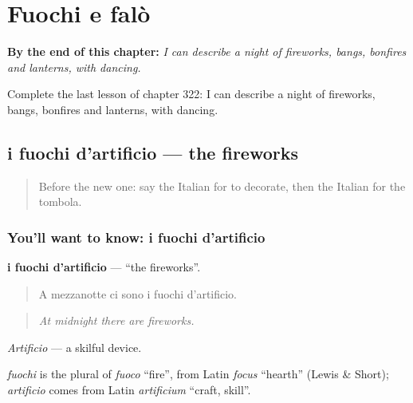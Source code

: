 
\chapter{Fuochi e falò}
\label{ch:it-fuochi-e-falo}

\begin{chapteropening}
\textbf{By the end of this chapter:} \emph{I can describe a night of fireworks, bangs, bonfires and lanterns, with dancing.}

Complete the last lesson of chapter 322: I can describe a night of fireworks, bangs, bonfires and lanterns, with dancing.
\end{chapteropening}

\section[i fuochi d'artificio]{i fuochi d'artificio — the fireworks}

\label{lesson:IT-C322-fuochi-d-artificio}



\begin{quote}
Before the new one: say the Italian for to decorate, then the Italian for the tombola.
\end{quote}

\subsection*{You'll want to know: i fuochi d'artificio}
\textbf{i fuochi d'artificio} — \textquotedblleft{}the fireworks\textquotedblright{}.

\begin{quote}
A mezzanotte ci sono i fuochi d'artificio.
\end{quote}

\begin{quote}
\emph{At midnight there are fireworks.}
\end{quote}

\emph{Artificio} — a skilful device.

\begin{cousinweb}
\emph{fuochi} is the plural of \emph{fuoco} \textquotedblleft{}fire\textquotedblright{}, from Latin \emph{focus} \textquotedblleft{}hearth\textquotedblright{} (Lewis \& Short); \emph{artificio} comes from Latin \emph{artificium} \textquotedblleft{}craft, skill\textquotedblright{}.
\end{cousinweb}

